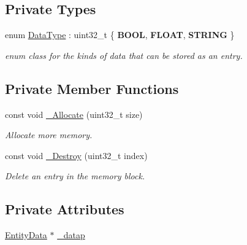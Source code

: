 \subsection*{Private Types}
\begin{DoxyCompactItemize}
\item 
enum \hyperlink{class_ensum_1_1_components_1_1_data_manager_abf17780149860893e39b561e1d98e1e2}{Data\+Type} \+: uint32\+\_\+t \{ {\bfseries B\+O\+OL}, 
{\bfseries F\+L\+O\+AT}, 
{\bfseries S\+T\+R\+I\+NG}
 \}\hypertarget{class_ensum_1_1_components_1_1_data_manager_abf17780149860893e39b561e1d98e1e2}{}\label{class_ensum_1_1_components_1_1_data_manager_abf17780149860893e39b561e1d98e1e2}
\begin{DoxyCompactList}\small\item\em enum class for the kinds of data that can be stored as an entry. \end{DoxyCompactList}
\end{DoxyCompactItemize}
\subsection*{Private Member Functions}
\begin{DoxyCompactItemize}
\item 
const void \hyperlink{class_ensum_1_1_components_1_1_data_manager_aa9f344da59b7fda790b79a9e453ba7c4}{\+\_\+\+Allocate} (uint32\+\_\+t size)
\begin{DoxyCompactList}\small\item\em Allocate more memory. \end{DoxyCompactList}\item 
const void \hyperlink{class_ensum_1_1_components_1_1_data_manager_a6f5c2ed92eba2cb4d5c15c451cbf089c}{\+\_\+\+Destroy} (uint32\+\_\+t index)
\begin{DoxyCompactList}\small\item\em Delete an entry in the memory block. \end{DoxyCompactList}\end{DoxyCompactItemize}
\subsection*{Private Attributes}
\begin{DoxyCompactItemize}
\item 
\hyperlink{struct_ensum_1_1_components_1_1_data_manager_1_1_entity_data}{Entity\+Data} $\ast$ \hyperlink{class_ensum_1_1_components_1_1_data_manager_a03fb52e21fcfdf08e9dd11a71da74385}{\+\_\+datap}
\end{DoxyCompactItemize}
